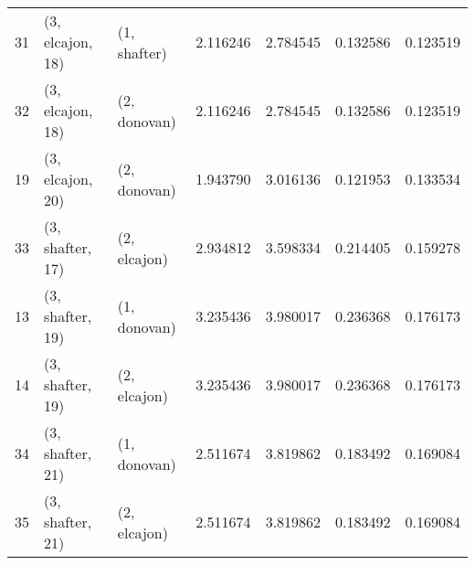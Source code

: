 \begin{tabular}{lllrrrr}
31 &  (3, elcajon, 18) &     (1, shafter) &  2.116246 &  2.784545 &   0.132586 &  0.123519 \\
32 &  (3, elcajon, 18) &     (2, donovan) &  2.116246 &  2.784545 &   0.132586 &  0.123519 \\
19 &  (3, elcajon, 20) &     (2, donovan) &  1.943790 &  3.016136 &   0.121953 &  0.133534 \\
33 &  (3, shafter, 17) &     (2, elcajon) &  2.934812 &  3.598334 &   0.214405 &  0.159278 \\
13 &  (3, shafter, 19) &     (1, donovan) &  3.235436 &  3.980017 &   0.236368 &  0.176173 \\
14 &  (3, shafter, 19) &     (2, elcajon) &  3.235436 &  3.980017 &   0.236368 &  0.176173 \\
34 &  (3, shafter, 21) &     (1, donovan) &  2.511674 &  3.819862 &   0.183492 &  0.169084 \\
35 &  (3, shafter, 21) &     (2, elcajon) &  2.511674 &  3.819862 &   0.183492 &  0.169084 \\
\bottomrule
\end{tabular}
